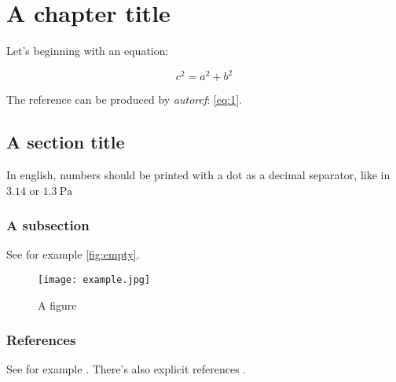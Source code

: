 \documentclass[a5,brazil,english]{brthesis}
\begin{document}
\printlos

\printtoc

\textual

\chapter{A chapter title}
\label{cha:chapter-title}

Let's beginning with an equation:

\begin{equation}
  \label{eq:1}
  c^2 = a^2 + b^2
\end{equation}

The reference can be produced by \textsl{autoref}: \autoref{eq:1}.

\section{A section title}
\label{sec:section-title}

In english, numbers should be printed with a dot as a decimal separator, like in $\num{3.14}$ or $\SI{1.3}{\pascal}$

\subsection{A subsection}
\label{sec:subsection}

See for example \autoref{fig:empty}.

\begin{figure}[!ht]
  \centering
  \texttt{[image: example.jpg]}
  \caption{A figure}
  \label{fig:empty}
\end{figure}

\subsection{References}
\label{sec:references}

See for example . There's also explicit references \cite{bib:furlani}.


\postextual


\end{document}
